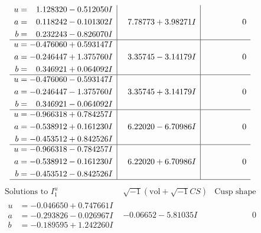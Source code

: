 \documentclass[1p]{elsarticle_modified}
\theoremstyle{definition}
\newcommand{\I}{\sqrt{-1}}
\begin{document}
$$\begin{array}{c|c|c}
\begin{aligned}
u &= \phantom{-}1.128320 - 0.512050 I \\
a &= \phantom{-}0.118242 - 0.101302 I \\
b &= \phantom{-}0.232243 - 0.826070 I\end{aligned}
 & \phantom{-}7.78773 + 3.98271 I & \phantom{-0.000000 } 0 \\ \hline\begin{aligned}
u &= -0.476060 + 0.593147 I \\
a &= -0.246447 + 1.375760 I \\
b &= \phantom{-}0.346921 + 0.064092 I\end{aligned}
 & \phantom{-}3.35745 - 3.14179 I & \phantom{-0.000000 } 0 \\ \hline\begin{aligned}
u &= -0.476060 - 0.593147 I \\
a &= -0.246447 - 1.375760 I \\
b &= \phantom{-}0.346921 - 0.064092 I\end{aligned}
 & \phantom{-}3.35745 + 3.14179 I & \phantom{-0.000000 } 0 \\ \hline\begin{aligned}
u &= -0.966318 + 0.784257 I \\
a &= -0.538912 + 0.161230 I \\
b &= -0.453512 + 0.842526 I\end{aligned}
 & \phantom{-}6.22020 - 6.70986 I & \phantom{-0.000000 } 0 \\ \hline\begin{aligned}
u &= -0.966318 - 0.784257 I \\
a &= -0.538912 - 0.161230 I \\
b &= -0.453512 - 0.842526 I\end{aligned}
 & \phantom{-}6.22020 + 6.70986 I & \phantom{-0.000000 } 0\\
 \hline 
 \end{array}$$\newpage$$\begin{array}{c|c|c}  
\text{Solutions to }I^u_{1}& \I (\text{vol} + \sqrt{-1}CS) & \text{Cusp shape}\\
 \hline 
\begin{aligned}
u &= -0.046650 + 0.747661 I \\
a &= -0.293826 - 0.026967 I \\
b &= -0.189595 + 1.242260 I\end{aligned}
 & -0.06652 - 5.81035 I & \phantom{-0.000000 } 0 \\ \hline\begin{aligned}

\end{aligned}
\end{array}$$
\end{document}
